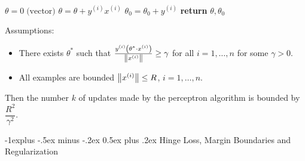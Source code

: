 \documentclass[10pt,landscape,a4paper]{article}
\makeatletter
\renewcommand{\subsection}{\@startsection{subsection}{2}{0mm}%
                                {-1explus -.5ex minus -.2ex}%
                                {0.5ex plus .2ex}%
                                {\normalfont\normalsize\bfseries}}
\makeatother
\begin{document}
\begin{multicols*}{3}
\begin{description}[itemsep=0pt]
	\item[Perceptron Algorithm (with offset)] ~
	\vspace*{-1em}
\begin{algorithm}[H]
{\fontsize{7}{0}
	\begin{algorithmic}
		\State $\theta=0\;\text{(vector)}$
		\State $\theta=\theta+y^{(i)}x^{(i)}$
		\State $\theta_0=\theta_0+y^{(i)}$
		\EndIf
		\EndFor
		\EndFor
		\State \textbf{return} $\theta,\theta_0$
		\EndProcedure
	\end{algorithmic}
}
\end{algorithm}
	\vspace*{-3.5em}
	\item[Convergence] Assumptions:
	\begin{itemize}
		\item There exists $\theta^*$ such that $\frac{y^{(i)}\left(\theta^*\cdot x^{(i)}\right)}{\norm{x^{(i)}}}\geq\gamma$ for all $i=1,\dots,n$ for some $\gamma>0.$
		\item All examples are bounded $\norm{x^{(i)}}\leq R$, $i=1,\dots,n.$
	\end{itemize}
	Then the number $k$ of updates made by the perceptron algorithm is bounded by $\dfrac{R^2}{\gamma^2}.$
\end{description}


\subsection{Hinge Loss, Margin Boundaries and Regularization}


\end{multicols*}
\end{document}
